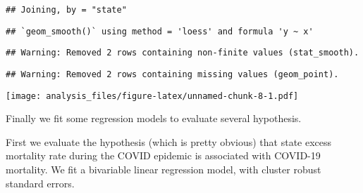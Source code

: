 \documentclass[
]{article}
\newenvironment{Shaded}{\begin{snugshade}}{\end{snugshade}}
\newcommand{\CharTok}[1]{\textcolor[rgb]{0.31,0.60,0.02}{#1}}
\newcommand{\DataTypeTok}[1]{\textcolor[rgb]{0.13,0.29,0.53}{#1}}
\newcommand{\DecValTok}[1]{\textcolor[rgb]{0.00,0.00,0.81}{#1}}
\newcommand{\FloatTok}[1]{\textcolor[rgb]{0.00,0.00,0.81}{#1}}
\newcommand{\KeywordTok}[1]{\textcolor[rgb]{0.13,0.29,0.53}{\textbf{#1}}}
\newcommand{\NormalTok}[1]{#1}
\newcommand{\OperatorTok}[1]{\textcolor[rgb]{0.81,0.36,0.00}{\textbf{#1}}}
\newcommand{\StringTok}[1]{\textcolor[rgb]{0.31,0.60,0.02}{#1}}
\begin{document}
\begin{verbatim}
## Joining, by = "state"
\end{verbatim}

\begin{Shaded}
\end{Shaded}

\begin{verbatim}
## `geom_smooth()` using method = 'loess' and formula 'y ~ x'
\end{verbatim}

\begin{verbatim}
## Warning: Removed 2 rows containing non-finite values (stat_smooth).
\end{verbatim}

\begin{verbatim}
## Warning: Removed 2 rows containing missing values (geom_point).
\end{verbatim}

\texttt{[image: analysis\_files/figure-latex/unnamed-chunk-8-1.pdf]}

Finally we fit some regression models to evaluate several hypothesis.

First we evaluate the hypothesis (which is pretty obvious) that state
excess mortality rate during the COVID epidemic is associated with
COVID-19 mortality. We fit a bivariable linear regression model, with
cluster robust standard errors.
\end{document}

